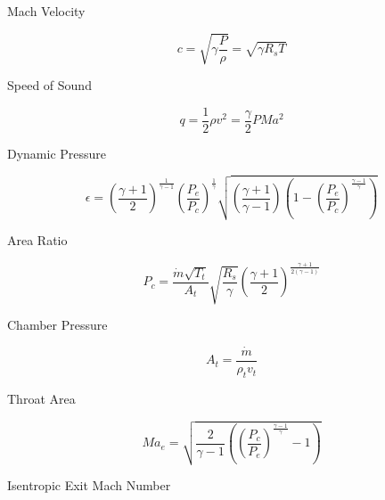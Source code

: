 \documentclass{article}
\begin{document}
Mach Velocity \cite{compressibleflow}

\begin{equation}
    c = \sqrt{\gamma \frac{P}{\rho}} = \sqrt{\gamma R_s T}
\end{equation}

Speed of Sound \cite{compressibleflow}

\begin{equation}
    q = \frac{1}{2} \rho v ^ 2 = \frac{\gamma}{2} P Ma ^ 2
\end{equation}

Dynamic Pressure \cite{compressibleflow}

\begin{equation}
    \epsilon = \left(\frac{\gamma + 1}{2}\right) ^ {\frac{1}{\gamma - 1}} \left(\frac{P_e}{P_c}\right) ^ {\frac{1}{\gamma}} \sqrt{\left(\frac{\gamma + 1}{\gamma - 1}\right) \left(1 - \left(\frac{P_e}{P_c}\right) ^ \frac{\gamma - 1}{\gamma}\right)}
\end{equation}

Area Ratio \cite{compressibleflow}

\begin{equation}
    P_c = \frac{\dot{m}\sqrt{T_t}}{A_t} \sqrt{\frac{R_s}{\gamma}} \left(\frac{\gamma + 1}{2}\right) ^ {\frac{\gamma + 1}{2\left(\gamma - 1\right)}}
\end{equation}

Chamber Pressure \cite{thrustsummary}

\begin{equation}
    A_t = \frac{\dot{m}}{\rho_t v_t}
\end{equation}

Throat Area \cite{cryorocket}

\begin{equation}
    Ma_e = \sqrt{\frac{2}{\gamma - 1}\left(\left(\frac{P_c}{P_e}\right) ^ {\frac{\gamma - 1}{\gamma}} - 1\right)}
\end{equation}

Isentropic Exit Mach Number

\pagebreak


\end{document}
